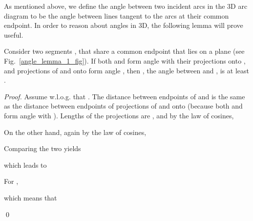 


As mentioned above,
we define the angle between two incident arcs in the 3D arc diagram
to be the angle between lines tangent to the arcs at their common endpoint.
In order to reason about angles in 3D, the following lemma will prove
useful.

\begin{lemma}
\label{angle_lemma_1}
Consider two segments ,  that share a common endpoint
that lies on a plane  (see Fig.~\ref{angle_lemma_1_fig}).
If both  and  form angle  with
their projections onto ,
and projections of  and  onto  form angle ,
then , the angle between  and , is at least .
\end{lemma}
\begin{proof}
Assume w.l.o.g. that . The distance  between endpoints
of  and  is the same as the distance between endpoints of projections
of  and  onto  (because both  and  form angle
 with ). Lengths of the projections are ,
and by the law of cosines,

On the other hand, again by the law of cosines,

Comparing the two yields

which leads to

For ,

which means that

\qed
\end{proof}

